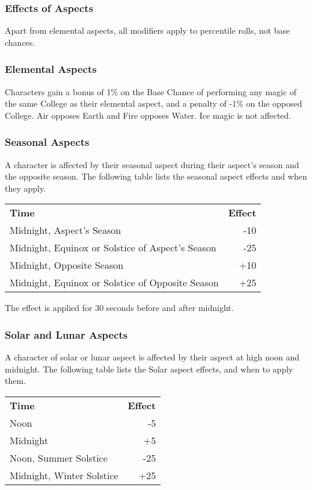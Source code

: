 \begin{multicols*}{3}
\subsubsection{Effects of Aspects}

Apart from elemental aspects, all modifiers apply to percentile rolls,
not base chances.

\subsubsection{Elemental Aspects}

Characters gain a bonus of 1\% on the Base Chance of performing any
magic of the same College as their elemental aspect, and a penalty of
-1\% on the opposed College. Air opposes Earth and Fire opposes
Water. Ice magic is not affected.

\subsubsection{Seasonal Aspects}

A character is affected by their seasonal aspect during their aspect's
season and the opposite season. The following table lists the seasonal
aspect effects and when they apply.

\begin{tabularx}{\linewidth}{Xr}
\textbf{Time} & \textbf{Effect} \\
Midnight, Aspect's Season & -10 \\
Midnight, Equinox or Solstice of Aspect's Season & -25 \\
Midnight, Opposite Season & +10 \\
Midnight, Equinox or Solstice of Opposite Season & +25 \\
\end{tabularx}

The effect is applied for 30 seconds before and after midnight.

\subsubsection{Solar and Lunar Aspects}

A character of solar or lunar aspect is affected by their aspect at
high noon and midnight. The following table lists the Solar aspect
effects, and when to apply them.

\begin{tabularx}{\linewidth}{Xr}
\textbf{Time} & \textbf{Effect} \\
Noon				& -5 \\
Midnight			& +5 \\
Noon, Summer Solstice		& -25 \\
Midnight, Winter Solstice	& +25 \\
\end{tabularx}


\end{multicols*}
